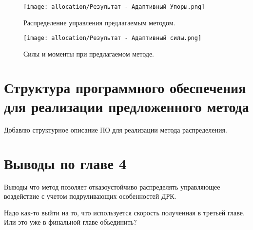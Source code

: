 \begin{figure}[ht]
    \centering
    \texttt{[image: allocation/Результат - Адаптивный Упоры.png]}
    \caption{Распределение управления предлагаемым методом.}
    \label{fig:mmt-300-allocation-optimal-thrust}
\end{figure}

\begin{figure}[ht]
    \centering
    \texttt{[image: allocation/Результат - Адаптивный силы.png]}
    \caption{Силы и моменты при предлагаемом методе.}
    \label{fig:mmt-300-allocation-optimal-force}
\end{figure}

\section{Структура программного обеспечения для реализации предложенного метода} \label{sec:Allocation/Software}
\begin{noteplan}
	Добавлю структурное описание ПО для реализации метода распределения.
\end{noteplan}

\section{Выводы по главе 4}
\begin{noteplan}
	Выводы что метод позоляет отказоустойчиво распределять управляющее воздействие с учетом подруливающих особенностей ДРК.
\end{noteplan}

\begin{notequestion}
	Надо как-то выйти на то, что используется скорость полученная в третьей главе. Или это уже в финальной главе обьединить?
\end{notequestion}